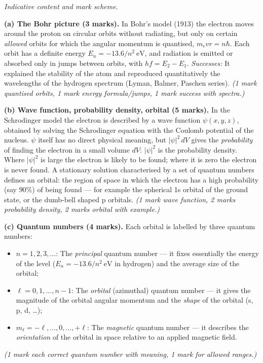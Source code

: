 \documentclass[11pt]{article}
\newcommand{\cle}[1]{{\popxbold\color{popdark}#1}}
\begin{document}
\begin{corrige}
\emph{Indicative content and mark scheme.}

\textbf{(a) The Bohr picture (3 marks).} In Bohr's model (1913) the electron moves around the proton on circular orbits without radiating, but only on certain \emph{allowed} orbits for which the angular momentum is quantised, $m_e v r = n\hbar$. Each orbit has a definite energy $E_n = -13.6/n^{2}\ \mathrm{eV}$, and radiation is emitted or absorbed only in jumps between orbits, with $hf = E_2 - E_1$. \emph{Successes:} It explained the stability of the atom and reproduced quantitatively the wavelengths of the hydrogen spectrum (Lyman, Balmer, Paschen series). \emph{(1 mark quantised orbits, 1 mark energy formula/jumps, 1 mark success with spectra.)}

\textbf{(b) Wave function, probability density, orbital (5 marks).} In the Schrodinger model the electron is described by a \cle{wave function} $\psi(x,y,z)$, obtained by solving the Schrodinger equation with the Coulomb potential of the nucleus. $\psi$ itself has no direct physical meaning, but $|\psi|^{2}\,dV$ gives the \emph{probability} of finding the electron in a small volume $dV$: $|\psi|^{2}$ is the \cle{probability density}. Where $|\psi|^{2}$ is large the electron is likely to be found; where it is zero the electron is never found. A stationary solution characterised by a set of quantum numbers defines an \cle{orbital}: the region of space in which the electron has a high probability (say $90\%$) of being found — for example the spherical 1s orbital of the ground state, or the dumb-bell shaped p orbitals. \emph{(1 mark wave function, 2 marks probability density, 2 marks orbital with example.)}

\textbf{(c) Quantum numbers (4 marks).} Each orbital is labelled by three quantum numbers:
\begin{itemize}
\item $n = 1, 2, 3, \dots$: The \emph{principal} quantum number — it fixes essentially the energy of the level ($E_n = -13.6/n^{2}\ \mathrm{eV}$ in hydrogen) and the average size of the orbital;
\item $\ell = 0, 1, \dots, n-1$: The \emph{orbital} (azimuthal) quantum number — it gives the magnitude of the orbital angular momentum and the \emph{shape} of the orbital (s, p, d, \dots);
\item $m_{\ell} = -\ell, \dots, 0, \dots, +\ell$: The \emph{magnetic} quantum number — it describes the \emph{orientation} of the orbital in space relative to an applied magnetic field.
\end{itemize}
\emph{(1 mark each correct quantum number with meaning, 1 mark for allowed ranges.)}


\end{corrige}
\end{document}
